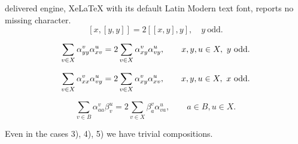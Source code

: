 \documentclass[10pt,a4paper]{amsart}
\begin{document}
delivered engine, XeLaTeX with its default Latin Modern text font, reports no missing character.
\begin{equation}\label{odd} 
[x,[y,y]]=2 [[x,y],y],\quad y \ \text{odd}.  
\end{equation}

\begin{equation}\label{id_const}
\sum_{v\in X}\alpha_{yy}^v\alpha_{xv}^u=2 \sum_{v\in X} \alpha_{xy}^v\alpha_{vy}^u,\qquad
x,y,u\in X,\   y \hbox{ odd} .
\end{equation}

\begin{equation}\label{id_const2}
\sum_{v\in X}\alpha_{xx}^v\alpha_{vy}^u=2 \sum_{v\in X} \alpha_{xy}^v\alpha_{xv}^u,\qquad
x,y,u\in X,\  x \hbox{ odd} .
\end{equation}

\begin{equation}\label{id_const3}
\sum_{v\in B}\alpha_{aa}^v\beta_{v}^u =2 \sum_{v\in X} \beta_{a}^v\alpha_{va}^u,\qquad
a\in B,u\in X.
\end{equation}

\begin{prop}\label{Prop345}
 Even in the cases 3), 4), 5) we have trivial compositions.
\end{prop}
\end{document}
